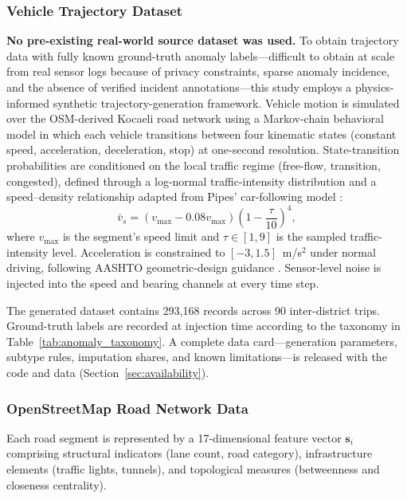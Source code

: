 \documentclass[journal]{IEEEtran}
\begin{document}
\subsubsection{Vehicle Trajectory Dataset}
\nocite{wen_hdsvt_2025,feng_traffic_2024_dup2,yu_spatio-temporal_2018,li_diffusion_2018,wu_graph_2019,francies_framework_2025,pipes_car_following_1967,aashto_green_book_2018}
\textbf{No pre-existing real-world source dataset was used.} To obtain trajectory data with fully known ground-truth anomaly labels---difficult to obtain at scale from real sensor logs because of privacy constraints, sparse anomaly incidence, and the absence of verified incident annotations---this study employs a physics-informed synthetic trajectory-generation framework. Vehicle motion is simulated over the OSM-derived Kocaeli road network using a Markov-chain behavioral model in which each vehicle transitions between four kinematic states (constant speed, acceleration, deceleration, stop) at one-second resolution. State-transition probabilities are conditioned on the local traffic regime (free-flow, transition, congested), defined through a log-normal traffic-intensity distribution and a speed--density relationship adapted from Pipes' car-following model \cite{pipes_car_following_1967}:
\begin{equation}
  \bar{v}_s = (v_{\max} - 0.08v_{\max})\left(1-\frac{\tau}{10}\right)^4,
\end{equation}
where $v_{\max}$ is the segment's speed limit and $\tau \in [1,9]$ is the sampled traffic-intensity level. Acceleration is constrained to $[-3,1.5]$~m/s$^2$ under normal driving, following AASHTO geometric-design guidance \cite{aashto_green_book_2018}. Sensor-level noise is injected into the speed and bearing channels at every time step.

The generated dataset contains 293{,}168 records across 90 inter-district trips. Ground-truth labels are recorded at injection time according to the taxonomy in Table~\ref{tab:anomaly_taxonomy}. A complete data card---generation parameters, subtype rules, imputation shares, and known limitations---is released with the code and data (Section~\ref{sec:availability}).

\subsubsection{OpenStreetMap Road Network Data}
\label{sec:osm_data}
Each road segment is represented by a 17-dimensional feature vector $\mathbf{s}_i$ \cite{zhong_multi-factor_2025} comprising structural indicators (lane count, road category), infrastructure elements (traffic lights, tunnels), and topological measures (betweenness and closeness centrality).
\end{document}
